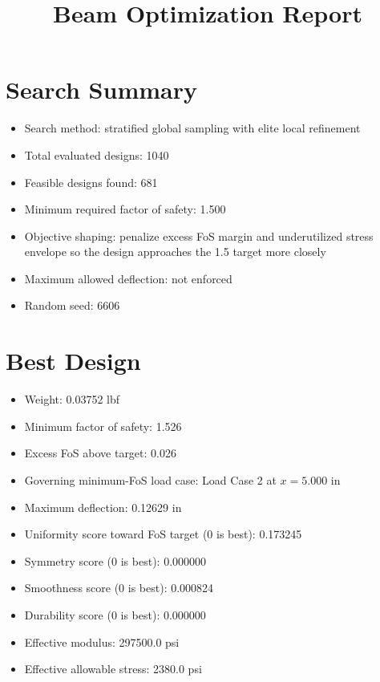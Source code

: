 \documentclass[11pt]{article}
\title{Beam Optimization Report}
\date{}
\begin{document}
\maketitle

\section*{Search Summary}
\begin{itemize}
\item Search method: stratified global sampling with elite local refinement
\item Total evaluated designs: 1040
\item Feasible designs found: 681
\item Minimum required factor of safety: 1.500
\item Objective shaping: penalize excess FoS margin and underutilized stress envelope so the design approaches the 1.5 target more closely
\item Maximum allowed deflection: not enforced
\item Random seed: 6606
\end{itemize}

\section*{Best Design}
\begin{itemize}
\item Weight: 0.03752 lbf
\item Minimum factor of safety: 1.526
\item Excess FoS above target: 0.026
\item Governing minimum-FoS load case: Load Case 2 at $x=5.000$ in
\item Maximum deflection: 0.12629 in
\item Uniformity score toward FoS target (0 is best): 0.173245
\item Symmetry score (0 is best): 0.000000
\item Smoothness score (0 is best): 0.000824
\item Durability score (0 is best): 0.000000
\item Effective modulus: 297500.0 psi
\item Effective allowable stress: 2380.0 psi
\end{itemize}
\end{document}
